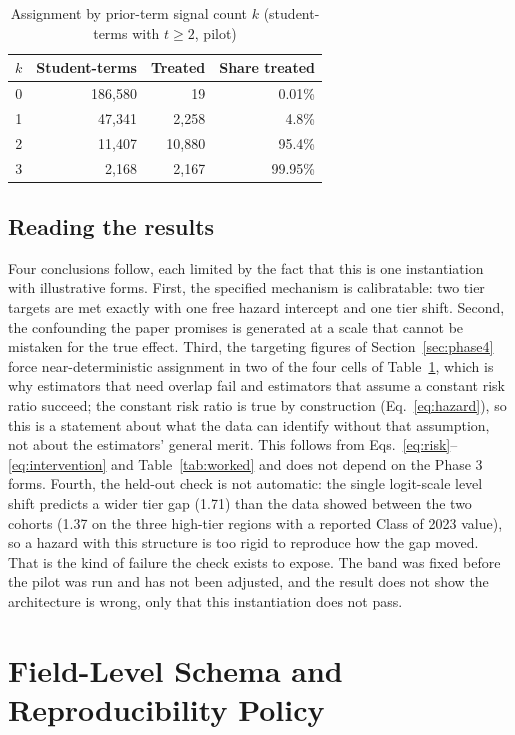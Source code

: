 \documentclass[11pt]{article}
\begin{document}
\begin{table}[ht]
\centering
\caption{Assignment by prior-term signal count $k$ (student-terms with $t \ge 2$, pilot)}
\label{tab:positivity}
\small
\begin{tabular}{@{}rrrr@{}}
\toprule
$k$ & Student-terms & Treated & Share treated \\
\midrule
0 & 186,580 & 19 & 0.01\% \\
1 & 47,341 & 2,258 & 4.8\% \\
2 & 11,407 & 10,880 & 95.4\% \\
3 & 2,168 & 2,167 & 99.95\% \\
\bottomrule
\end{tabular}
\end{table}

\subsection{Reading the results}

Four conclusions follow, each limited by the fact that this is one instantiation with illustrative forms. First, the specified mechanism is calibratable: two tier targets are met exactly with one free hazard intercept and one tier shift. Second, the confounding the paper promises is generated at a scale that cannot be mistaken for the true effect. Third, the targeting figures of Section~\ref{sec:phase4} force near-deterministic assignment in two of the four cells of Table~\ref{tab:positivity}, which is why estimators that need overlap fail and estimators that assume a constant risk ratio succeed; the constant risk ratio is true by construction (Eq.~\ref{eq:hazard}), so this is a statement about what the data can identify without that assumption, not about the estimators' general merit. This follows from Eqs.~\ref{eq:risk}--\ref{eq:intervention} and Table~\ref{tab:worked} and does not depend on the Phase 3 forms. Fourth, the held-out check is not automatic: the single logit-scale level shift predicts a wider tier gap (1.71) than the data showed between the two cohorts (1.37 on the three high-tier regions with a reported Class of 2023 value), so a hazard with this structure is too rigid to reproduce how the gap moved. That is the kind of failure the check exists to expose. The band was fixed before the pilot was run and has not been adjusted, and the result does not show the architecture is wrong, only that this instantiation does not pass.

\FloatBarrier
\section{Field-Level Schema and Reproducibility Policy}
\label{sec:appendixB}
\end{document}
